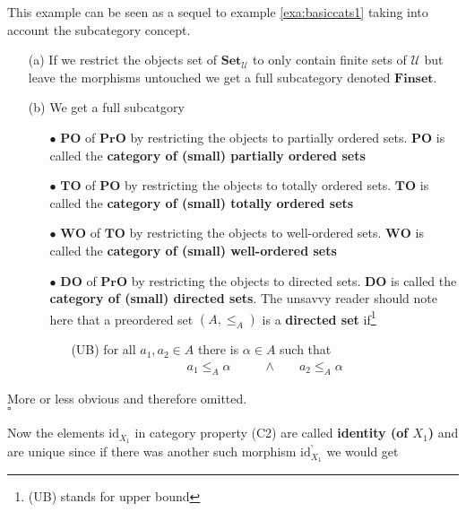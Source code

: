 \begin{exa}
\label{exa:basiccats2}
This example can be seen as a sequel to example \ref{exa:basiccats1} taking into account the subcategory concept.
\begin{enumerate}
\item[(a)]
If we restrict the objects set of $\mathbf{Set}_{\mathcal{U}}$ to only contain finite sets of $\mathcal{U}$ but leave the morphisms untouched we get a full subcategory denoted $\mathbf{Finset}$.
\item[(b)]
We get a full subcatgory
\begin{enumerate}
\item[$\bullet$]
$\mathbf{PO}$ of $\mathbf{PrO}$ by restricting the objects to partially ordered sets. $\mathbf{PO}$ is called the \textbf{category of (small) partially ordered sets}
\item[$\bullet$]
$\mathbf{TO}$ of $\mathbf{PO}$ by restricting the objects to totally ordered sets. $\mathbf{TO}$ is called the \textbf{category of (small) totally ordered sets}
\item[$\bullet$]
$\mathbf{WO}$ of $\mathbf{TO}$ by restricting the objects to well-ordered sets. $\mathbf{WO}$ is called the \textbf{category of (small) well-ordered sets}
\item[$\bullet$]
$\mathbf{DO}$ of $\mathbf{PrO}$ by restricting the objects to directed sets. $\mathbf{DO}$ is called the \textbf{category of (small) directed sets}. The unsavvy reader should note here that a preordered set $(A,\leq_{A})$ is a \textbf{directed set} if\footnote{(UB) stands for upper bound}
\begin{enumerate}
\item[(UB)]
for all $a_{1},a_{2} \in A$ there is $\alpha \in A$ such that
\begin{align*}
  a_{1}
  \leq_{A}
  \alpha
  \qquad
  &\land
  \qquad
  a_{2}
  \leq_{A}
  \alpha
\end{align*}
\end{enumerate}
\end{enumerate}
\end{enumerate}
\end{exa}
\begin{prf}
More or less obvious and therefore omitted.
\\
\phantom{proven}
\hfill
$\square$
\end{prf}
Now the elements $\mathrm{id}_{X_{1}}$ in category property (C2) are called \textbf{identity (of $X_{1}$)} and are unique since if there was another such morphism $\mathrm{id}_{X_{1}}^{\backprime}$ we would get
